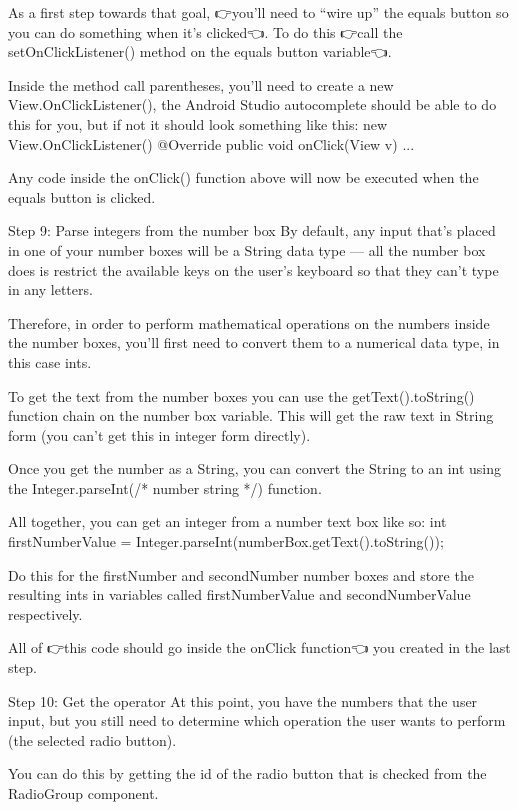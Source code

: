         As a first step towards that goal, 👉you’ll need to “wire up” the equals button so you can do something when it’s clicked👈. To do this 👉call the setOnClickListener() method on the equals button variable👈.

        Inside the method call parentheses, you’ll need to create a new View.OnClickListener(), the Android Studio autocomplete should be able to do this for you, but if not it should look something like this:
            new View.OnClickListener() {
                @Override
                public void onClick(View v) {...}
            }

        Any code inside the onClick() function above will now be executed when the equals button is clicked.

    Step 9: Parse integers from the number box
        By default, any input that’s placed in one of your number boxes will be a String data type — all the number box does is restrict the available keys on the user’s keyboard so that they can’t type in any letters.

        Therefore, in order to perform mathematical operations on the numbers inside the number boxes, you’ll first need to convert them to a numerical data type, in this case ints.

        To get the text from the number boxes you can use the getText().toString() function chain on the number box variable. This will get the raw text in String form (you can’t get this in integer form directly).

        Once you get the number as a String, you can convert the String to an int using the Integer.parseInt(/* number string */) function.

        All together, you can get an integer from a number text box like so:    
           int firstNumberValue = Integer.parseInt(numberBox.getText().toString());
     
        Do this for the firstNumber and secondNumber number boxes and store the resulting ints in variables called firstNumberValue and secondNumberValue respectively.

        All of 👉this code should go inside the onClick function👈 you created in the last step.

    Step 10: Get the operator
        At this point, you have the numbers that the user input, but you still need to determine which operation the user wants to perform (the selected radio button).

        You can do this by getting the id of the radio button that is checked from the RadioGroup component.

